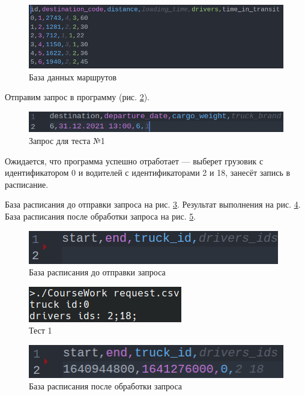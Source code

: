\begin{figure}[H]
	\centering
	\includegraphics[width=0.7\linewidth]{photo/tests/user/route_db}
	\caption{База данных маршрутов}
	\label{route_db_}
\end{figure}

Отправим запрос в программу (рис. \ref{request_1}).

\begin{figure}[H]
	\centering
	\includegraphics[width=0.7\linewidth]{photo/tests/user/request_1}
	\caption{Запрос для теста №1}
	\label{request_1}
\end{figure}

Ожидается, что программа успешно отработает --- выберет грузовик с идентификатором 0 
и водителей с идентификаторами 2 и 18, занесёт запись в расписание.

База расписания до отправки запроса на рис. \ref{schedule_db_init}.
Результат выполнения на рис. \ref{test_1}.
База расписания после обработки запроса на рис. \ref{schedule_db_test_1}.

\begin{figure}[H]
	\centering
	\includegraphics[width=0.7\linewidth]{photo/tests/user/schedule_db_init}
	\caption{База расписания до отправки запроса}
	\label{schedule_db_init}
\end{figure}

\begin{figure}[H]
	\centering
	\includegraphics[width=0.7\linewidth]{photo/tests/user/test_1}
	\caption{Тест 1}
	\label{test_1}
\end{figure}

\begin{figure}[H]
	\centering
	\includegraphics[width=0.7\linewidth]{photo/tests/user/schedule_db_test_1}
	\caption{База расписания после обработки запроса}
	\label{schedule_db_test_1}
\end{figure}

